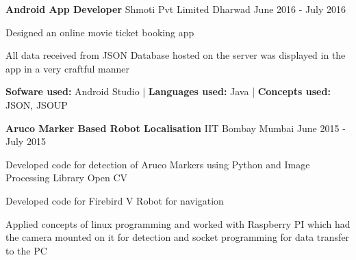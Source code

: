 \begin{cventries}
  \cventry
    {\textbf{Android App Developer}}
    {Shmoti Pvt Limited}
    {Dharwad}
    {June 2016 - July 2016}
    {
      \begin{cvitems}
        \item {Designed an online movie ticket booking app}
        \item {All data received from JSON Database hosted on the server was displayed in the app in a very craftful manner}
        \item {\textbf{Sofware used:} Android Studio | \textbf{Languages used:} Java | \textbf{Concepts used:} JSON, JSOUP}
      \end{cvitems}
    }
  \cventry
    {\textbf{Aruco Marker Based Robot Localisation}}
    {IIT Bombay}
    {Mumbai}
    {June 2015 - July 2015}
    {
      \begin{cvitems}
        \item {Developed code for detection of Aruco Markers using Python and Image Processing Library Open CV}
        \item {Developed code for Firebird V Robot for navigation}
         \item {Applied concepts of linux programming and worked with Raspberry PI which had the camera mounted on it for detection and socket programming for data transfer to the PC}
      \end{cvitems}
    }
\end{cventries}
  
